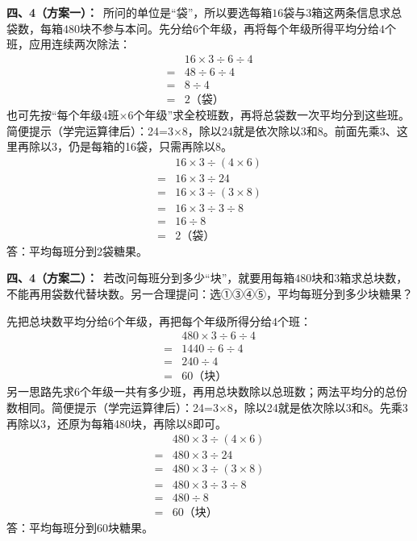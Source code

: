 \documentclass[multi=snippet,border=0pt]{standalone}
\newenvironment{snippet}[3]{\begin{minipage}{#1bp}\color{answerred}\fontsize{#2}{#3}\selectfont\raggedright}{\end{minipage}}
\begin{document}
\begin{snippet}{505}{11.5}{14}\textbf{四、4（方案一）：}\ 所问的单位是“袋”，所以要选每箱\(16\)袋与\(3\)箱这两条信息求总袋数，每箱\(480\)块不参与本问。先分给\(6\)个年级，再将每个年级所得平均分给\(4\)个班，应用连续两次除法：\[\begin{aligned}&16\times3\div6\div4\\={}&48\div6\div4\\={}&8\div4\\={}&2\text{（袋）}\end{aligned}\]也可先按“每个年级\(4\)班\(\times6\)个年级”求全校班数，再将总袋数一次平均分到这些班。简便提示（学完运算律后）：24=3×8，除以24就是依次除以3和8。前面先乘3、这里再除以3，仍是每箱的16袋，只需再除以8。\[\begin{aligned}&16\times3\div(4\times6)\\={}&16\times3\div24\\={}&16\times3\div(3\times8)\\={}&16\times3\div3\div8\\={}&16\div8\\={}&2\text{（袋）}\end{aligned}\]答：平均每班分到2袋糖果。\end{snippet}
\begin{snippet}{505}{11.5}{14}\textbf{四、4（方案二）：}\ 若改问每班分到多少“块”，就要用每箱\(480\)块和\(3\)箱求总块数，不能再用袋数代替块数。另一合理提问：选①③④⑤，平均每班分到多少块糖果？\par 先把总块数平均分给\(6\)个年级，再把每个年级所得分给\(4\)个班：\[\begin{aligned}&480\times3\div6\div4\\={}&1440\div6\div4\\={}&240\div4\\={}&60\text{（块）}\end{aligned}\]另一思路先求\(6\)个年级一共有多少班，再用总块数除以总班数；两法平均分的总份数相同。简便提示（学完运算律后）：24=3×8，除以24就是依次除以3和8。先乘3再除以3，还原为每箱480块，再除以8即可。\[\begin{aligned}&480\times3\div(4\times6)\\={}&480\times3\div24\\={}&480\times3\div(3\times8)\\={}&480\times3\div3\div8\\={}&480\div8\\={}&60\text{（块）}\end{aligned}\]答：平均每班分到60块糖果。\end{snippet}
\end{document}
